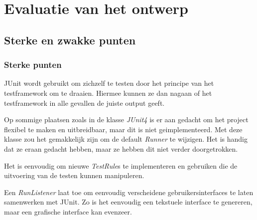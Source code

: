 \documentclass[i1]{oss}
\begin{document}
\newpage

\section{Evaluatie van het ontwerp}


\subsection{Sterke en zwakke punten}

\subsubsection{Sterke punten}
\begin{description}
\item JUnit wordt gebruikt om zichzelf te testen door het principe van het testframework om te draaien. Hiermee kunnen ze dan nagaan of het testframework in alle gevallen de juiste output geeft. 

\item Op sommige plaatsen zoals in de klasse \emph{JUnit4} is er aan gedacht om het project flexibel te maken en uitbreidbaar, maar dit is niet geimplementeerd. Met deze klasse zou het gemakkelijk zijn om de default \emph{Runner} te wijzigen. Het is handig dat ze eraan gedacht hebben, maar ze hebben dit niet verder doorgetrokken.

\item Het is eenvoudig om nieuwe \emph{TestRule}s te implementeren en gebruiken die de uitvoering van de testen kunnen manipuleren.

\item Een \emph{RunListener} laat toe om eenvoudig verscheidene gebruikersinterfaces te laten samenwerken met JUnit. Zo is het eenvoudig een tekstuele interface te genereren, maar een grafische interface kan evenzeer.  
\end{description}
\end{document}
